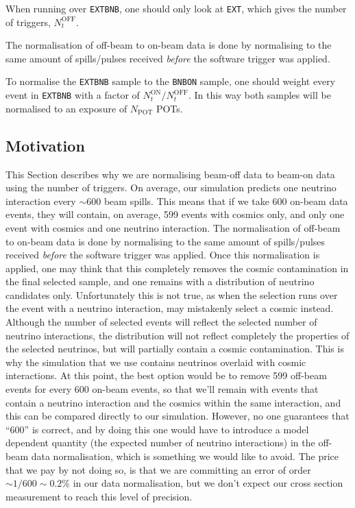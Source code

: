 \documentclass[a4paper, oneside, 12pt, onecolumn]{article}
\newcommand{\extbnb}{\texttt{EXTBNB}\xspace}
\newcommand{\bnbon}{\texttt{BNBON}\xspace}
\begin{document}
When running over \extbnb, one should only look at \texttt{EXT}, which gives the number of triggers, $N_t^\text{OFF}$. 

The normalisation of off-beam to on-beam data is done by normalising to the same amount of spills/pulses received \emph{before} the software trigger was applied.

To normalise the \extbnb sample to the \bnbon sample, one should weight every event in \extbnb with a factor of $N_t^\text{ON}/N_t^\text{OFF}$. In this way both samples will be normalised to an exposure of $N_\text{POT}$ POTs.



\subsection{Motivation}

This Section describes why we are normalising beam-off data to beam-on data using the number of triggers.
On average, our simulation predicts one neutrino interaction every $\sim 600$ beam spills. This means that if we take 600 on-beam data events, they will contain, on average, 599 events with cosmics only, and only one event with cosmics and one neutrino interaction. The normalisation of off-beam to on-beam data is done by normalising to the same amount of spills/pulses received \emph{before} the software trigger was applied. Once this normalisation is applied, one may think that this completely removes the cosmic contamination in the final selected sample, and one remains with a distribution of neutrino candidates only. Unfortunately this is not true, as when the selection runs over the event with a neutrino interaction, may mistakenly select a cosmic instead. Although the number of selected events will reflect the selected number of neutrino interactions, the distribution will not reflect completely the properties of the selected neutrinos, but will partially contain a cosmic contamination. This is why the simulation that we use contains neutrinos overlaid with cosmic interactions. At this point, the best option would be to remove 599 off-beam events for every 600 on-beam events, so that we'll remain with events that contain a neutrino interaction and the cosmics within the same interaction, and this can be compared directly to our simulation. However, no one guarantees that ``600'' is correct, and by doing this one would have to introduce a model dependent quantity (the expected number of neutrino interactions) in the off-beam data normalisation, which is something we would like to avoid. The price that we pay by not doing so, is that we are committing an error of order $\sim1/600\sim0.2\%$ in our data normalisation, but we don't expect our cross section measurement to reach this level of precision. 
\end{document}
